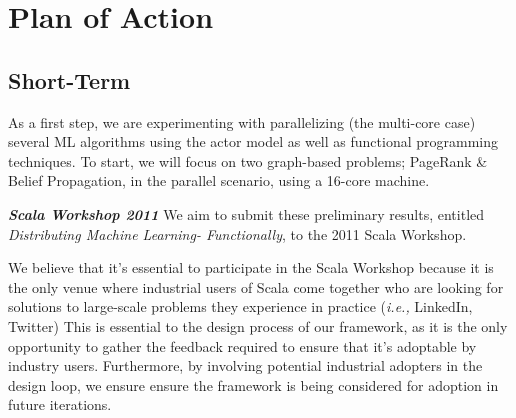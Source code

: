 \documentclass[acmtocl]{acmtrans2m}
\begin{document}
\section{Plan of Action}


\subsection{Short-Term}

As a first step, we are experimenting with parallelizing (the multi-core case) several ML algorithms using the actor model as well as functional programming techniques. To start, we will focus on two graph-based problems; PageRank \& Belief Propagation, in the parallel scenario, using a 16-core machine.

{\bf \em Scala Workshop 2011} We aim to submit these preliminary results, entitled {\em Distributing Machine Learning- Functionally}, to the 2011 Scala Workshop.

We believe that it's essential to participate in the Scala Workshop because it is the only venue where industrial users of Scala come together who are looking for solutions to large-scale problems they experience in practice ({\em i.e.,} LinkedIn, Twitter) This is essential to the design process of our framework, as it is the only opportunity to gather the feedback required to ensure that it's adoptable by industry users. Furthermore, by involving potential industrial adopters in the design loop, we ensure ensure the framework is being considered for adoption in future iterations.
\end{document}
